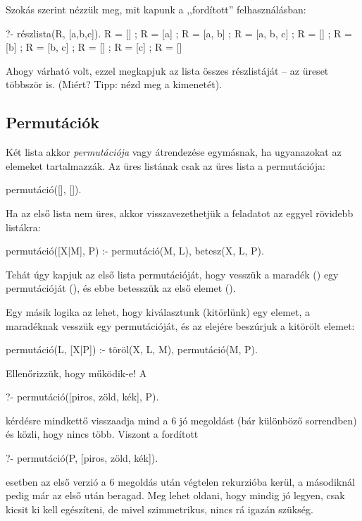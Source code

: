 Szokás szerint nézzük meg, mit kapunk a
,,fordított'' felhasználásban:
\begin{query}
?- részlista(R, [a,b,c]).
R = [] ;
R = [a] ;
R = [a, b] ;
R = [a, b, c] ;
R = [] ;
R = [b] ;
R = [b, c] ;
R = [] ;
R = [c] ;
R = []
\end{query}
Ahogy várható volt, ezzel megkapjuk az \pr{[a,b,c]}
lista összes részlistáját -- az üreset többször is.
(Miért? Tipp: nézd meg a  kimenetét).

\subsection*{Permutációk}
Két lista akkor \emph{permutációja} vagy átrendezése
egymásnak, ha ugyanazokat az elemeket
tartalmazzák. Az üres listának csak az üres lista a
permutációja:
\begin{program}
permutáció([], []).
\end{program}
Ha az első lista nem üres, akkor visszavezethetjük a
feladatot az eggyel rövidebb listákra:
\begin{program}
permutáció([X|M], P) :-
    permutáció(M, L), betesz(X, L, P).
\end{program}
Tehát úgy kapjuk az első lista permutációját, hogy
vesszük a maradék () egy permutációját
(), és ebbe betesszük az első elemet ().

Egy másik logika az lehet, hogy kiválasztunk
(kitörlünk) egy elemet, a maradéknak vesszük egy
permutációját, és az elejére beszúrjuk a kitörölt
elemet:
\begin{program}
permutáció(L, [X|P]) :-
    töröl(X, L, M), permutáció(M, P).
\end{program}

Ellenőrizzük, hogy működik-e! A
\begin{query}
?- permutáció([piros, zöld, kék], P).
\end{query}
kérdésre mindkettő visszaadja mind a 6 jó megoldást
(bár különböző sorrendben) és közli, hogy nincs
több. Viszont a fordított
\begin{query}
?- permutáció(P, [piros, zöld, kék]).
\end{query}
esetben az első verzió a 6 megoldás után végtelen
rekurzióba kerül, a másodiknál pedig már az első
után beragad. Meg lehet oldani, hogy mindig jó
legyen, csak kicsit ki kell egészíteni, de mivel
szimmetrikus, nincs rá igazán szükség.

